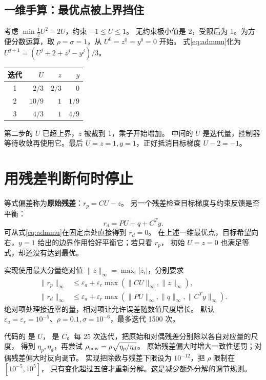 \subsection{一维手算：最优点被上界挡住}
考虑 $\min \tfrac12U^2-2U$，约束 $-1\leq U\leq1$。
无约束极小值是 2，受限后为 1。为方便分数运算，取 $\rho=\sigma=1$，从 $U^0=z^0=y^0=0$ 开始。
式\eqref{eq:admmu}化为 $U^{j+1}=(U^j+2+z^j-y^j)/3$。
\begin{center}
\begin{tabular}{crrr}\toprule
迭代 & $U$ & $z$ & $y$\\\midrule
1 & $2/3$ & $2/3$ & $0$\\
2 & $10/9$ & $1$ & $1/9$\\
3 & $4/3$ & $1$ & $4/9$\\\bottomrule
\end{tabular}
\end{center}
第二步的 $U$ 已超上界，$z$ 被裁到 1，乘子开始增加。
中间的 $U$ 是迭代量，控制器等待收敛再使用它。最后 $U=z=1,y=1$，正好抵消目标梯度 $U-2=-1$。

\section{用残差判断何时停止}
等式偏差称为\textbf{原始残差}：$r_p=CU-z$。
另一个残差检查目标梯度与约束反馈是否平衡：
\[
 r_d=PU+q+C^Ty.
\]
可从式\eqref{eq:admmu}在固定点处直接得到 $r_d=0$。
在上述一维最优点，目标希望向右，$y=1$ 给出的边界作用恰好平衡它；若只看 $r_p$，
初始 $U=z=0$ 也满足等式，却还没有达到最优。

实现使用最大分量绝对值 $\|z\|_\infty=\max_i|z_i|$，分别要求
\begin{align*}
 \|r_p\|_\infty&\leq\varepsilon_a+\varepsilon_r\max(\|CU\|_\infty,\|z\|_\infty),\\
 \|r_d\|_\infty&\leq\varepsilon_a+\varepsilon_r\max(\|PU\|_\infty,\|q\|_\infty,\|C^Ty\|_\infty).
\end{align*}
绝对项处理接近零的量，相对项让允许误差随数值尺度增长。
默认 $\varepsilon_a=\varepsilon_r=10^{-5}$、$\rho=0.1,\sigma=10^{-6}$，最多迭代 1500 次。

\par\noindent\begin{minipage}{\linewidth}

\end{minipage}\par
代码的  是 $U$， 是 $C$。每 25 次迭代，把原始和对偶残差分别除以各自对应量的尺度，
得到 $\eta_p,\eta_d$，再尝试 $\rho_{\rm new}=\rho\sqrt{\eta_p/\eta_d}$。
原始残差偏大时增大一致性惩罚；对偶残差偏大时反向调节。
实现把除数与残差下限设为 $10^{-12}$，把 $\rho$ 限制在 $[10^{-5},10^5]$，
只有变化超过五倍才重新分解。这是减少额外分解的调节规则。

